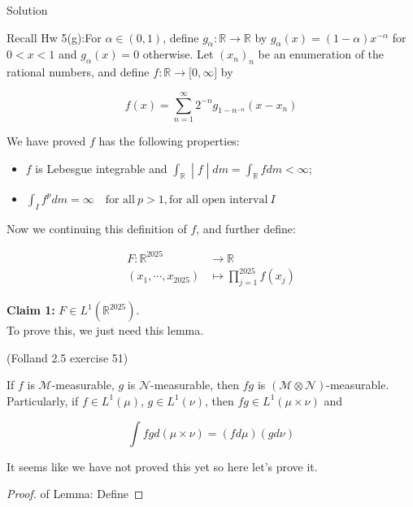 \begin{qlsolution}{Solution}

Recall Hw 5(g):For \(\alpha \in (0,1)\), define \(g_{\alpha}:\mathbb{R}\rightarrow\mathbb{R}\) by \(g_{\alpha}(x) = (1 - \alpha)x^{- \alpha}\) for \(0 < x < 1\) and \(g_{\alpha}(x) = 0\) otherwise. Let \((x_{n})_{n}\) be an enumeration of the rational numbers, and define \(f:\mathbb{R}\rightarrow\lbrack 0,\infty\rbrack\) by

\[f(x) = \sum\limits_{n = 1}^{\infty}2^{- n}g_{1 - n^{- n}}(x - x_{n})\]

We have proved \(f\) has the following properties:

\begin{itemize}
\item
  \(f\) is Lebesgue integrable and \(\left. \int_{\mathbb{R}} \middle| f \middle| dm = \int_{\mathbb{R}}f dm < \infty \right.\);
\item
  \(\int_{I}f^{p} dm = \infty\quad\text{for all}\ p > 1,\text{for all open interval}\ I\)
\end{itemize}

Now we continuing this definition of \(f\), and further define:

\[\begin{matrix}
{F:\mathbb{R}^{2025}} & {\rightarrow\mathbb{R}} \\
{(x_{1},\cdots,x_{2025})} & {\mapsto\prod\limits_{j = 1}^{2025}f(x_{j})}
\end{matrix}\]

\textbf{Claim 1:} \(F \in L^{1}(\mathbb{R}^{2025})\).\\
To prove this, we just need this lemma.

\begin{lemma}{(Folland 2.5 exercise 51)}

If \(f\) is \(\mathcal{M}\)-measurable, \(g\) is \(\mathcal{N}\)-measurable, then \(fg\) is \((\mathcal{M} \otimes \mathcal{N})\)-measurable.\\
Particularly, if \(f \in L^{1}(\mu)\), \(g \in L^{1}(\nu)\), then \(fg \in L^{1}(\mu \times \nu)\) and

\[\int fg d(\mu \times \nu) = (f d\mu)(g d\nu)\]

\end{lemma}

It seems like we have not proved this yet so here let's prove it.

\begin{proof}

of Lemma: Define


\end{proof}
\end{qlsolution}
